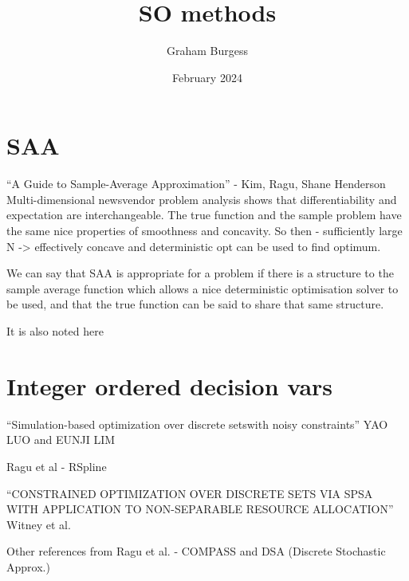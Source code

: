 \documentclass{article}
\title{SO methods}
\author{Graham Burgess}
\date{February 2024}
\begin{document}
\maketitle

\section{SAA}
``A Guide to Sample-Average Approximation'' - Kim, Ragu, Shane Henderson
Multi-dimensional newsvendor problem analysis shows that differentiability and expectation are interchangeable. The true function and the sample problem have the same nice properties of smoothness and concavity. So then - sufficiently large N -> effectively concave and deterministic opt can be used to find optimum.

We can say that SAA is appropriate for a problem if there is a structure to the sample average function which allows a nice deterministic optimisation solver to be used, and that the true function can be said to share that same structure.

It is also noted here

\section{Integer ordered decision vars}
``Simulation-based optimization over discrete setswith noisy constraints'' YAO LUO and EUNJI LIM

Ragu et al - RSpline

``CONSTRAINED OPTIMIZATION OVER DISCRETE SETS VIA SPSA WITH APPLICATION TO NON-SEPARABLE RESOURCE ALLOCATION'' Witney et al.

Other references from Ragu et al. - COMPASS and DSA (Discrete Stochastic Approx.)
\end{document}
